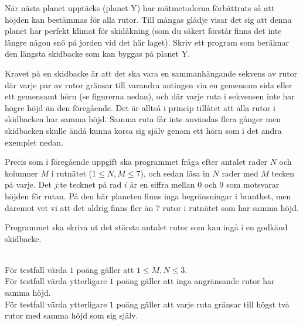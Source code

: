 När nästa planet upptäcks (planet Y) har mätmetoderna förbättrats så att höjden kan bestämmas för alla rutor. Till mångas glädje visar det sig att denna planet har perfekt klimat för skidåkning (som du säkert förstår finns det inte längre någon snö på jorden vid det här laget). Skriv ett program som beräknar den längsta skidbacke som kan byggas på planet Y.

Kravet på en skidbacke är att det ska vara en sammanhängande sekvens av rutor där varje par av rutor gränsar till varandra antingen via en gemensam sida eller ett gemensamt hörn (se figurerna nedan), och där varje ruta i sekvensen inte har högre höjd än den föregående. Det är alltså i princip tillåtet att alla rutor i skidbacken har samma höjd. Samma ruta får inte användas flera gånger men skidbacken skulle ändå kunna korsa sig själv genom ett hörn som i det andra exemplet nedan.

Precis som i föregående uppgift ska programmet fråga efter antalet rader $N$ och kolumner $M$ i rutnätet ($1\leq N,M \leq 7$), och 
sedan läsa in $N$ rader med $M$ tecken på varje.
Det $j$:te tecknet på rad $i$ är en siffra mellan
0 och 9 som motsvarar höjden för rutan. På den här planeten finns inga begränsningar i branthet, men däremot vet vi att det aldrig finns fler än $7$ rutor i rutnätet som har samma höjd.

Programmet ska skriva ut det största antalet rutor som kan ingå i en godkänd skidbacke.

\\
För testfall värda $1$ poäng gäller att $1\leq M,N \leq 3$. \\
För testfall värda ytterligare $1$ poäng gäller att inga angränsande rutor har samma höjd. \\
För testfall värda ytterligare $1$ poäng gäller att varje ruta gränsar till högst två rutor med samma höjd som sig själv.\\


